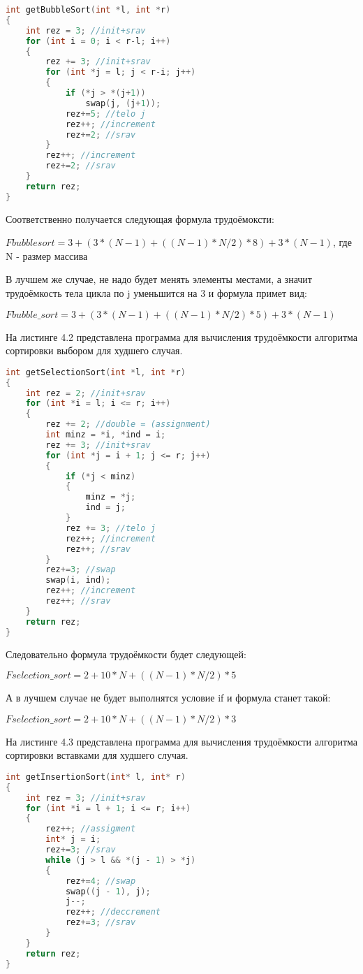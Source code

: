 \begin{lstlisting}[language=c++, caption=Вычисление трудоёмкости алгоритма сортировки пузырьком]
int getBubbleSort(int *l, int *r)
{
	int rez = 3; //init+srav
	for (int i = 0; i < r-l; i++)
	{
		rez += 3; //init+srav
		for (int *j = l; j < r-i; j++)
		{
			if (*j > *(j+1))
				swap(j, (j+1));
			rez+=5; //telo j
			rez++; //increment
			rez+=2; //srav
		}
		rez++; //increment
		rez+=2; //srav
	}
	return rez;
}
\end{lstlisting}

Соответственно получается следующая формула трудоёмоксти:

$Fbubblesort = 3 + (3*(N-1) + ((N-1)*N/2)*8) + 3*(N-1)$, где N - размер массива

В лучшем же случае, не надо будет менять элементы местами, а значит трудоёмкость тела цикла по j уменьшится на 3 и формула примет вид:

$Fbubble\_sort = 3 + (3*(N-1) + ((N-1)*N/2)*5) + 3*(N-1)$

\newpage
На листинге 4.2 представлена программа для вычисления трудоёмкости алгоритма сортировки выбором для худшего случая.

\begin{lstlisting}[language=c++, caption=Вычисление трудоёмкости алгоритма сортировки выбором]
int getSelectionSort(int *l, int *r)
{
	int rez = 2; //init+srav
	for (int *i = l; i <= r; i++)
	{
		rez += 2; //double = (assignment)
		int minz = *i, *ind = i;
		rez += 3; //init+srav
		for (int *j = i + 1; j <= r; j++)
		{
			if (*j < minz)
			{
				minz = *j;
				ind = j;
			}
			rez += 3; //telo j
			rez++; //increment
			rez++; //srav
		}
		rez+=3; //swap
		swap(i, ind);
		rez++; //increment
		rez++; //srav
	}
	return rez;
}
\end{lstlisting}

Следовательно формула трудоёмкости будет следующей:

$Fselection\_sort = 2 + 10*N + ((N-1)*N/2)*5$

А в лучшем случае не будет выполнятся условие if и формула станет такой:

$Fselection\_sort = 2 + 10*N + ((N-1)*N/2)*3$

\newpage
На листинге 4.3 представлена программа для вычисления трудоёмкости алгоритма сортировки вставками для худшего случая.

\begin{lstlisting}[language=c++, caption=Вычисление трудоёмкости алгоритма сортировки вставками]
int getInsertionSort(int* l, int* r)
{
	int rez = 3; //init+srav
	for (int *i = l + 1; i <= r; i++)
	{
		rez++; //assigment
		int* j = i;
		rez+=3; //srav
		while (j > l && *(j - 1) > *j)
		{
			rez+=4; //swap
			swap((j - 1), j);
			j--;
			rez++; //deccrement
			rez+=3; //srav
		}
	}
	return rez;
}
\end{lstlisting}


